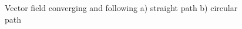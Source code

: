 \documentclass[conf]{new-aiaa}
\begin{document}
\begin{figure}[H]
	\begin{subfigmatrix}{2}%
		\centering	
		\hspace*{0mm}
	\end{subfigmatrix}
	\caption{Vector field converging and following a) straight path b) circular path}
	\label{fig:vfPrimitives}
\end{figure}
\end{document}

